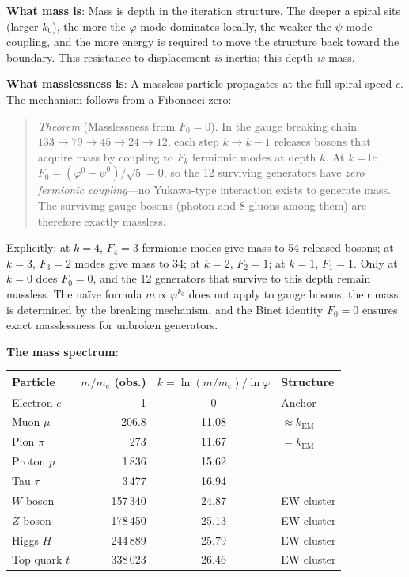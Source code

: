 \documentclass[12pt,a4paper]{article}
\begin{document}
\textbf{What mass is}: Mass is depth in the iteration structure. The deeper a spiral sits (larger $k_0$), the more the $\varphi$-mode dominates locally, the weaker the $\psi$-mode coupling, and the more energy is required to move the structure back toward the boundary. This resistance to displacement \emph{is} inertia; this depth \emph{is} mass.

\textbf{What masslessness is}: A massless particle propagates at the full spiral speed $c$. The mechanism follows from a Fibonacci zero:

\begin{quote}
\textit{Theorem} (Masslessness from $F_0 = 0$). In the gauge breaking chain $133 \to 79 \to 45 \to 24 \to 12$, each step $k \to k{-}1$ releases bosons that acquire mass by coupling to $F_k$ fermionic modes at depth $k$. At $k = 0$: $F_0 = (\varphi^0 - \psi^0)/\sqrt{5} = 0$, so the 12 surviving generators have \emph{zero fermionic coupling}---no Yukawa-type interaction exists to generate mass. The surviving gauge bosons (photon and 8 gluons among them) are therefore exactly massless.
\end{quote}

\noindent Explicitly: at $k = 4$, $F_4 = 3$ fermionic modes give mass to 54 released bosons; at $k = 3$, $F_3 = 2$ modes give mass to 34; at $k = 2$, $F_2 = 1$; at $k = 1$, $F_1 = 1$. Only at $k = 0$ does $F_0 = 0$, and the 12 generators that survive to this depth remain massless. The na\"ive formula $m \propto \varphi^{k_0}$ does not apply to gauge bosons; their mass is determined by the breaking mechanism, and the Binet identity $F_0 = 0$ ensures exact masslessness for unbroken generators.

\textbf{The mass spectrum}:
\begin{center}
\begin{tabular}{|l|r|c|l|}
\hline
\textbf{Particle} & $m/m_e$ (obs.) & $k = \ln(m/m_e)/\ln\varphi$ & \textbf{Structure} \\
\hline
Electron $e$ & 1 & 0 & Anchor \\
Muon $\mu$ & 206.8 & 11.08 & $\approx k_{\text{EM}}$ \\
Pion $\pi$ & 273 & 11.67 & $= k_{\text{EM}}$ \\
Proton $p$ & 1\,836 & 15.62 & \\
Tau $\tau$ & 3\,477 & 16.94 & \\
$W$ boson & 157\,340 & 24.87 & EW cluster \\
$Z$ boson & 178\,450 & 25.13 & EW cluster \\
Higgs $H$ & 244\,889 & 25.79 & EW cluster \\
Top quark $t$ & 338\,023 & 26.46 & EW cluster \\
\hline
\end{tabular}
\end{center}
\end{document}
